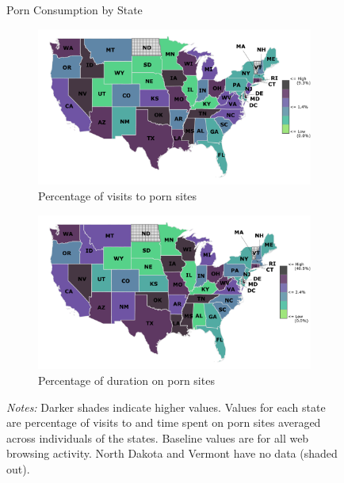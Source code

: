 \documentclass[12pt, letterpaper]{article}
\begin{document}
\begin{figure}[t]
	\caption{Porn Consumption by State}
	\label{fig:map_porn}
	\centering
	\begin{subfigure}[t]{0.8\textwidth}
		\centering
		\includegraphics[width=\textwidth]{../figs/map_visits.pdf}
		\caption{Percentage of visits to porn sites}
	\end{subfigure}
	\begin{subfigure}[t]{0.8\textwidth}
		\centering
		\includegraphics[width=\textwidth]{../figs/map_duration.pdf}
		\caption{Percentage of duration on porn sites}
	\end{subfigure}
	\caption*{\footnotesize \emph{Notes:} 
		Darker shades indicate higher values.
		Values for each state are percentage of visits to and time spent on porn sites averaged across individuals of the states.
		Baseline values are for all web browsing activity.
		North Dakota and Vermont have no data (shaded out).}
\end{figure}
\end{document}
